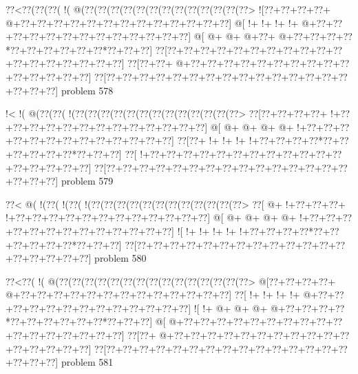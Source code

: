 \vbox{\vbox{\goo
\0??<\0??(\0??(\0??(\- !(\- @(\0??(\0??(\0??(\0??(\0??(\0??(\0??(\0??(\0??(\0??(\0??(\0??(\0??>
\- ![\0??+\0??+\0??+\0??+\- @+\0??+\0??+\0??+\0??+\0??+\0??+\0??+\0??+\0??+\0??+\0??+\0??+\0??]
\- @[\- !+\- !+\- !+\- !+\- @+\0??+\0??+\0??+\0??+\0??+\0??+\0??+\0??+\0??+\0??+\0??+\0??+\0??]
\- @[\- @+\- @+\- @+\0??+\- @+\0??+\0??+\0??+\0??*\0??+\0??+\0??+\0??+\0??+\0??*\0??+\0??+\0??]
\0??[\0??+\0??+\0??+\0??+\0??+\0??+\0??+\0??+\0??+\0??+\0??+\0??+\0??+\0??+\0??+\0??+\0??+\0??]
\0??[\0??+\0??+\- @+\0??+\0??+\0??+\0??+\0??+\0??+\0??+\0??+\0??+\0??+\0??+\0??+\0??+\0??+\0??]
\0??[\0??+\0??+\0??+\0??+\0??+\0??+\0??+\0??+\0??+\0??+\0??+\0??+\0??+\0??+\0??+\0??+\0??+\0??]
}
\hfil problem 578\hfil\break
}



\vbox{\vbox{\goo
\- !<\- !(\- @(\0??(\0??(\- !(\0??(\0??(\0??(\0??(\0??(\0??(\0??(\0??(\0??(\0??(\0??(\0??(\0??>
\0??[\0??+\0??+\0??+\0??+\- !+\0??+\0??+\0??+\0??+\0??+\0??+\0??+\0??+\0??+\0??+\0??+\0??+\0??]
\- @[\- @+\- @+\- @+\- @+\- !+\0??+\0??+\0??+\0??+\0??+\0??+\0??+\0??+\0??+\0??+\0??+\0??+\0??]
\0??[\0??+\- !+\- !+\- !+\- !+\0??+\0??+\0??+\0??*\0??+\0??+\0??+\0??+\0??+\0??*\0??+\0??+\0??]
\0??[\- !+\0??+\0??+\0??+\0??+\0??+\0??+\0??+\0??+\0??+\0??+\0??+\0??+\0??+\0??+\0??+\0??+\0??]
\0??[\0??+\0??+\0??+\0??+\0??+\0??+\0??+\0??+\0??+\0??+\0??+\0??+\0??+\0??+\0??+\0??+\0??+\0??]
}
\hfil problem 579\hfil\break
}



\vbox{\vbox{\goo
\0??<\- @(\- !(\0??(\- !(\0??(\- !(\0??(\0??(\0??(\0??(\0??(\0??(\0??(\0??(\0??(\0??(\0??(\0??>
\0??[\- @+\- !+\0??+\0??+\0??+\- !+\0??+\0??+\0??+\0??+\0??+\0??+\0??+\0??+\0??+\0??+\0??+\0??]
\- @[\- @+\- @+\- @+\- @+\- !+\0??+\0??+\0??+\0??+\0??+\0??+\0??+\0??+\0??+\0??+\0??+\0??+\0??]
\- ![\- !+\- !+\- !+\- !+\- !+\0??+\0??+\0??+\0??*\0??+\0??+\0??+\0??+\0??+\0??*\0??+\0??+\0??]
\0??[\0??+\0??+\0??+\0??+\0??+\0??+\0??+\0??+\0??+\0??+\0??+\0??+\0??+\0??+\0??+\0??+\0??+\0??]
}
\hfil problem 580\hfil\break
}



\vbox{\vbox{\goo
\0??<\0??(\- !(\- @(\0??(\0??(\0??(\0??(\0??(\0??(\0??(\0??(\0??(\0??(\0??(\0??(\0??(\0??(\0??>
\- @[\0??+\0??+\0??+\0??+\- @+\0??+\0??+\0??+\0??+\0??+\0??+\0??+\0??+\0??+\0??+\0??+\0??+\0??]
\0??[\- !+\- !+\- !+\- !+\- @+\0??+\0??+\0??+\0??+\0??+\0??+\0??+\0??+\0??+\0??+\0??+\0??+\0??]
\- ![\- !+\- @+\- @+\- @+\- @+\0??+\0??+\0??+\0??*\0??+\0??+\0??+\0??+\0??+\0??*\0??+\0??+\0??]
\- @[\- @+\0??+\0??+\0??+\0??+\0??+\0??+\0??+\0??+\0??+\0??+\0??+\0??+\0??+\0??+\0??+\0??+\0??]
\0??[\0??+\- @+\0??+\0??+\0??+\0??+\0??+\0??+\0??+\0??+\0??+\0??+\0??+\0??+\0??+\0??+\0??+\0??]
\0??[\0??+\0??+\0??+\0??+\0??+\0??+\0??+\0??+\0??+\0??+\0??+\0??+\0??+\0??+\0??+\0??+\0??+\0??]
}
\hfil problem 581\hfil\break
}



